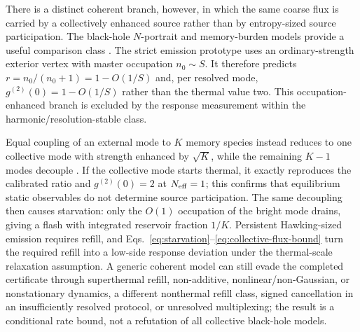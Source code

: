 \documentclass[12pt]{article}
\newcommand{\Neff}{N_{\rm eff}}
\begin{document}
There is a distinct coherent branch, however, in which the same coarse
flux is carried by a collectively enhanced source rather than by
entropy-sized source participation.  The black-hole $N$-portrait and
memory-burden models provide a useful comparison class
\cite{DvaliGomez2013,DvaliPanchenko2016,DvaliEisemannMichelZell2020,
DvaliValbuenaBermudezZantedeschi2024}.  The strict emission prototype
uses an ordinary-strength exterior vertex with master occupation
$n_0\sim S$.  It therefore predicts
$r=n_0/(n_0+1)=1-O(1/S)$ and, per resolved mode,
$g^{(2)}(0)=1-O(1/S)$ rather than the thermal value two.  This
occupation-enhanced branch is excluded by the response measurement
within the harmonic/resolution-stable class.

Equal coupling of an external mode to $K$ memory species instead reduces
to one collective mode with strength enhanced by $\sqrt K$, while the
remaining $K-1$ modes decouple \cite{DvaliPanchenko2016}.  If the
collective mode starts thermal, it exactly reproduces the calibrated
ratio and $g^{(2)}(0)=2$ at $\Neff=1$; this confirms that equilibrium
static observables do not determine source participation.  The same
decoupling then causes starvation: only the $O(1)$ occupation of the
bright mode drains, giving a flash with integrated reservoir fraction
$1/K$.  Persistent Hawking-sized emission requires refill, and
Eqs.~\eqref{eq:starvation}--\eqref{eq:collective-flux-bound} turn the
required refill into a low-side response deviation under the
thermal-scale relaxation assumption.  A generic coherent model can
still evade the completed certificate through superthermal refill,
non-additive, nonlinear/non-Gaussian, or nonstationary dynamics, a different
nonthermal refill class, signed cancellation in an insufficiently resolved
protocol, or unresolved multiplexing; the result is a conditional rate bound,
not a refutation of all collective black-hole models.
\end{document}
